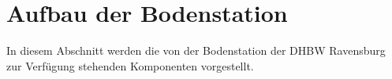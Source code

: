 
\clearpage
\section{Aufbau der Bodenstation}

In diesem Abschnitt werden die von der Bodenstation der \ac{DHBW} Ravensburg zur Verfügung stehenden Komponenten vorgestellt.
